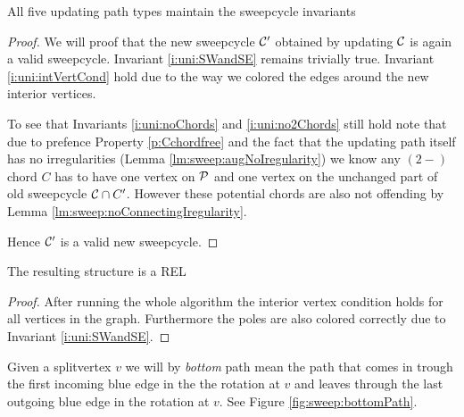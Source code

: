     \begin{lemma}
      All five updating path types maintain the sweepcycle invariants
    \end{lemma}
    \begin{proof}
      We will proof that the new sweepcycle $\C'$ obtained by updating $\C$ is again a valid sweepcycle. Invariant \ref{i:uni:SWandSE} remains trivially true. Invariant \ref{i:uni:intVertCond} hold due to the way we colored the edges around the new interior vertices.

      To see that Invariants \ref{i:uni:noChords} and \ref{i:uni:no2Chords} still hold note that due to prefence Property \ref{p:Cchordfree} and the fact that the updating path itself has no irregularities (Lemma \ref{lm:sweep:augNoIregularity})
      we know any $(2-)$chord $C$ has to have one vertex on $\P$ and one vertex on the unchanged part of old sweepcycle $\C \cap C'$. However these potential chords are also not offending by Lemma \ref{lm:sweep:noConnectingIregularity}.

      Hence $\C'$ is a valid new sweepcycle.
    \end{proof}

    \begin{lemma}
      \label{lm:sweep:REL}
      The resulting structure is a REL
    \end{lemma}

    \begin{proof}
      After running the whole algorithm the interior vertex condition holds for all vertices in the graph. Furthermore the poles are also colored correctly due to Invariant \ref{i:uni:SWandSE}.
    \end{proof}

    Given a splitvertex $v$ we will by \emph{bottom} path mean the path that comes in trough the first incoming blue edge in the the rotation at $v$ and leaves through the last outgoing blue edge in the rotation at $v$. See Figure \ref{fig:sweep:bottomPath}.


